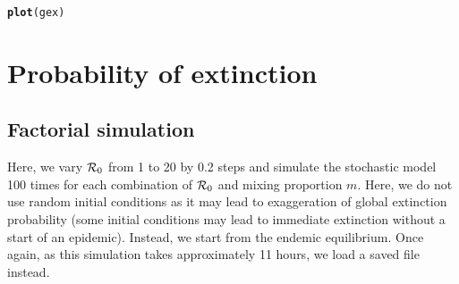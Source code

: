 \documentclass[12pt]{article}\usepackage[]{graphicx}\usepackage[]{color}
\makeatletter
\newcommand{\hlstd}[1]{\textcolor[rgb]{0.345,0.345,0.345}{#1}}%
\newcommand{\hlkwd}[1]{\textcolor[rgb]{0.737,0.353,0.396}{\textbf{#1}}}%
\newenvironment{kframe}{%
 \def\at@end@of@kframe{}%
 \ifinner\ifhmode%
  \def\at@end@of@kframe{\end{minipage}}%
  \begin{minipage}{\columnwidth}%
 \fi\fi%
 \def\FrameCommand##1{\hskip\@totalleftmargin \hskip-\fboxsep
 \colorbox{shadecolor}{##1}\hskip-\fboxsep
     \hskip-\linewidth \hskip-\@totalleftmargin \hskip\columnwidth}%
 \MakeFramed {\advance\hsize-\width
   \@totalleftmargin\z@ \linewidth\hsize
   \@setminipage}}%
 {\par\unskip\endMakeFramed%
 \at@end@of@kframe}
\newenvironment{knitrout}{}{} %
\newcommand{\R}{{\cal R}}
\makeatother
\begin{document}
\begin{knitrout}
\begin{kframe}
{\ttfamily\noindent\bfseries\color{errorcolor}{\#\# Error in ggplot(simdf3): object 'simdf3' not found}}\begin{alltt}
\hlkwd{plot}\hlstd{(gex)}
\end{alltt}


{\ttfamily\noindent\bfseries\color{errorcolor}{\#\# Error in plot(gex): object 'gex' not found}}\end{kframe}
\end{knitrout}


\section{Probability of extinction}

\subsection{Factorial simulation}

Here, we vary $\R_0$ from 1 to 20 by 0.2 steps and simulate the stochastic model 100 times for each combination of $\R_0$ and mixing proportion $m$.
Here, we do not use random initial conditions as it may lead to exaggeration of global extinction probability (some initial conditions may lead to immediate extinction without a start of an epidemic).
Instead, we start from the endemic equilibrium.
Once again, as this simulation takes approximately 11 hours, we load a saved file instead.
\end{document}
